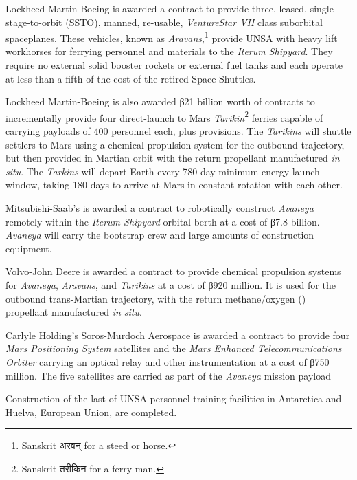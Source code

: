 Lockheed Martin-Boeing is awarded a contract to provide three, leased, single-stage-to-orbit (SSTO), manned, re-usable, {\it VentureStar VII} class suborbital spaceplanes. These vehicles, known as {\it Aravans},\footnote{Sanskrit अरवन् for a steed or horse.} provide UNSA with heavy lift workhorses for ferrying personnel and materials to the {\it Iterum Shipyard}. They require no external solid booster rockets or external fuel tanks and each operate at less than a fifth of the cost of the retired Space Shuttles.

Lockheed Martin-Boeing is also awarded β21 billion worth of contracts to incrementally provide four direct-launch to Mars {\it Tarikin}\footnote{Sanskrit तरीकिन for a ferry-man.} ferries capable of carrying payloads of 400 personnel each, plus provisions. The {\it Tarikins} will shuttle settlers to Mars using a chemical  propulsion system for the outbound trajectory, but then provided in Martian orbit with the return  propellant manufactured {\it in situ}. The {\it Tarkins} will depart Earth every 780 day minimum-energy launch window, taking 180 days to arrive at Mars in constant rotation with each other.

Mitsubishi-Saab's is awarded a contract to robotically construct {\it Avaneya} remotely within the {\it Iterum Shipyard} orbital berth at a cost of β7.8 billion. {\it Avaneya} will carry the bootstrap crew and large amounts of construction equipment.

Volvo-John Deere is awarded a contract to provide chemical propulsion systems for {\it Avaneya}, {\it Aravans}, and {\it Tarikins} at a cost of β920 million. It is used for the outbound trans-Martian trajectory, with the return methane/oxygen () propellant manufactured {\it in situ}.

Carlyle Holding's Soros-Murdoch Aerospace is awarded a contract to provide four {\it Mars Positioning System} satellites and the {\it Mars Enhanced Telecommunications Orbiter} carrying an optical relay and other instrumentation at a cost of β750 million. The five satellites are carried as part of the {\it Avaneya} mission payload
\StopTimelineDate

Construction of the last of UNSA personnel training facilities in Antarctica and Huelva, European Union, are completed.
\StopTimelineDate

